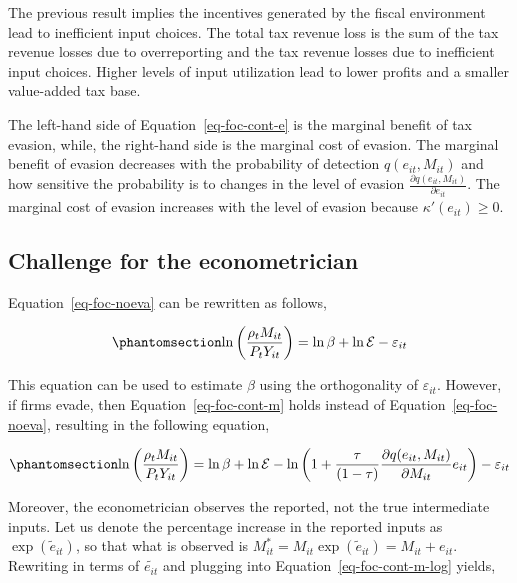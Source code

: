 \documentclass[
  12pt]{article}
\theoremstyle{definition}
\theoremstyle{remark}
\begin{document}
The previous result implies the incentives generated by the fiscal
environment lead to inefficient input choices. The total tax revenue
loss is the sum of the tax revenue losses due to overreporting and the
tax revenue losses due to inefficient input choices. Higher levels of
input utilization lead to lower profits and a smaller value-added tax
base.

The left-hand side of Equation~\ref{eq-foc-cont-e} is the marginal
benefit of tax evasion, while, the right-hand side is the marginal cost
of evasion. The marginal benefit of evasion decreases with the
probability of detection \(q(e_{it}, M_{it})\) and how sensitive the
probability is to changes in the level of evasion
\(\frac{\partial q(e_{it}, M_{it})}{\partial e_{it}}\). The marginal
cost of evasion increases with the level of evasion because
\(\kappa'(e_{it})\ge0\).

\subsection{Challenge for the
econometrician}\label{challenge-for-the-econometrician}

Equation~\ref{eq-foc-noeva} can be rewritten as follows,

\begin{equation}\phantomsection\label{eq-foc-noeva-log}{
\ln\left(\frac{\rho_tM_{it}}{P_tY_{it}}\right)=\ln\beta+\ln\mathcal{E}-\varepsilon_{it}
}\end{equation}

This equation can be used to estimate \(\beta\) using the orthogonality
of \(\varepsilon_{it}\). However, if firms evade, then
Equation~\ref{eq-foc-cont-m} holds instead of
Equation~\ref{eq-foc-noeva}, resulting in the following equation,

\begin{equation}\phantomsection\label{eq-foc-cont-m-log}{
\ln\left(\frac{\rho_tM_{it}}{P_tY_{it}}\right)=\ln\beta+\ln\mathcal{E}-\ln\left(1+\frac{\tau}{(1-\tau)}\frac{\partial q(e_{it},M_{it})}{\partial M_{it}}e_{it}\right)-\varepsilon_{it}
}\end{equation}

Moreover, the econometrician observes the reported, not the true
intermediate inputs. Let us denote the percentage increase in the
reported inputs as \(\exp(\tilde{e}_{it})\), so that what is observed is
\(M^*_{it}=M_{it}\exp(\tilde{e}_{it})=M_{it}+e_{it}\). Rewriting in
terms of \(\tilde{e_{it}}\) and plugging into
Equation~\ref{eq-foc-cont-m-log} yields,
\end{document}
